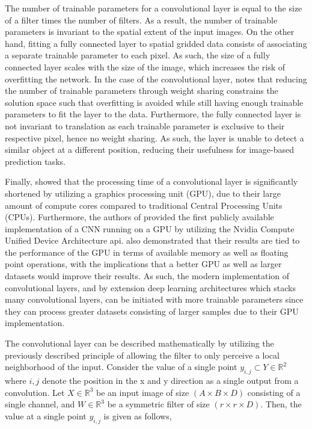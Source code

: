 \documentclass[../main/thesis.tex]{subfiles}
\begin{document}
The number of trainable parameters for a convolutional layer is equal to the size of a filter times the number of filters. As a result, the number of trainable parameters is invariant to the spatial extent of the input images. On the other hand, fitting a fully connected layer to spatial gridded data consists of associating a separate trainable parameter to each pixel. As such, the size of a fully connected layer scales with the size of the image, which increases the risk of overfitting the network. In the case of the convolutional layer, \citet{LeCun1989} notes that reducing the number of trainable parameters through weight sharing constrains the solution space such that overfitting is avoided while still having enough trainable parameters to fit the layer to the data. Furthermore, the fully connected layer is not invariant to translation as each trainable parameter is exclusive to their respective pixel, hence no weight sharing. As such, the layer is unable to detect a similar object at a different position, reducing their usefulness for image-based prediction tasks.

Finally, \citet{Ciresan2012} showed that the processing time of a convolutional layer is significantly shortened by utilizing a graphics processing unit (GPU), due to their large amount of compute cores compared to traditional Central Processing Units (CPUs). Furthermore, the authors of \citet{Krizhevsky2012} provided the first publicly available implementation of a CNN running on a GPU by utilizing the Nvidia Compute Unified Device Architecture api. \citet{Krizhevsky2012} also demonstrated that their results are tied to the performance of the GPU in terms of available memory as well as floating point operations, with the implications that a better GPU as well as larger datasets would improve their results. As such, the modern implementation of convolutional layers, and by extension deep learning architectures which stacks many convolutional layers, can be initiated with more trainable parameters since they can process greater datasets consisting of larger samples due to their GPU implementation.

The convolutional layer can be described mathematically by utilizing the previously described principle of allowing the filter to only perceive a local neighborhood of the input. Consider the value of a single point $y_{i,j} \subset Y \in{\mathbb{R}^2}$ where $i,j$ denote the position in the x and y direction as a single output from a convolution. Let $X \in{\mathbb{R}^3}$ be an input image of size $(A \times B \times D)$ consisting of a single channel, and $W \in{\mathbb{R}^3}$ be a symmetric filter of size $(r \times r \times D)$. Then, the value at a single point $y_{i,j}$ is given as follows,
\end{document}
